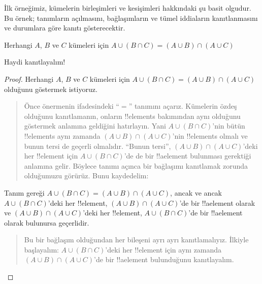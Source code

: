 



İlk örneğimiz, kümelerin birleşimleri ve kesişimleri hakkındaki şu
basit olgudur. Bu örnek; tanımların açılmasını, bağlaşımların ve tümel
iddiaların kanıtlanmasını ve durumlara göre kanıtı gösterecektir.

\begin{prop}
Herhangi $A$, $B$ ve $C$ kümeleri için $A \cup (B \cap C) = (A \cup B)
\cap (A \cup C)$
\end{prop}

Haydi kanıtlayalım!{}

\begin{proof}
Herhangi $A$, $B$ ve $C$ kümeleri için $A \cup (B \cap C) = (A \cup
B) \cap (A \cup C)$ olduğunu göstermek istiyoruz.
\begin{quote}
Önce önermenin ifadesindeki ``$=$'' tanımını açarız. Kümelerin özdeş
olduğunu kanıtlamanın, onların !!{element}s bakımından aynı olduğunu
göstermek anlamına geldiğini hatırlayın. Yani $A \cup (B \cap C)$'nin
bütün !!{element}s aynı zamanda $(A \cup B) \cap (A \cup C)$'nin
!!{element}s olmalı ve bunun tersi de geçerli olmalıdır. ``Bunun
tersi'', $(A \cup B) \cap (A \cup C)$'deki her !!{element} için $A
\cup (B \cap C)$'de de bir !!a{element} bulunması gerektiği anlamına
gelir. Böylece tanımı açınca bir bağlaşımı kanıtlamak zorunda olduğumuzu
görürüz. Bunu kaydedelim:
\end{quote}
Tanım gereği $A \cup (B \cap C) = (A \cup B) \cap (A \cup C)$, ancak
ve ancak $A \cup (B \cap C)$'deki her !!{element}, $(A \cup B) \cap (A
\cup C)$'de bir !!a{element} olarak ve $(A \cup B) \cap (A \cup C)$'deki
her !!{element}, $A \cup (B \cap C)$'de bir !!a{element} olarak bulunursa geçerlidir.
\begin{quote}
Bu bir bağlaşım olduğundan her bileşeni ayrı ayrı kanıtlamalıyız.
İlkiyle başlayalım: $A \cup (B \cap C)$'deki her !!{element} için aynı
zamanda $(A \cup B) \cap (A \cup C)$'de bir !!a{element} bulunduğunu
kanıtlayalım.


\end{quote}
\end{proof}
